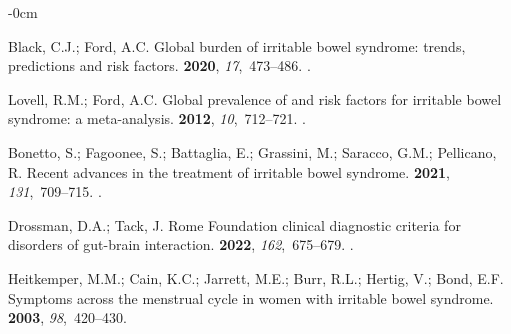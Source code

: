 \documentclass[diagnostics,article,accept,pdftex,moreauthors]{Definitions/mdpi}
\begin{document}
\begin{adjustwidth}{-\extralength}{0cm}



%
%

\begin{thebibliography}{999}

Black, C.J.; Ford, A.C.
\newblock Global burden of irritable bowel syndrome: trends, predictions and
  risk factors.
 {\bf 2020}, {\em
  17},~473--486.
.

Lovell, R.M.; Ford, A.C.
\newblock Global prevalence of and risk factors for irritable bowel syndrome: a
  meta-analysis.
 {\bf 2012}, {\em
  10},~712--721.
.

Bonetto, S.; Fagoonee, S.; Battaglia, E.; Grassini, M.; Saracco, G.M.;
  Pellicano, R.
\newblock Recent advances in the treatment of irritable bowel syndrome.
 {\bf 2021}, {\em
  131},~709--715.
.

Drossman, D.A.; Tack, J.
\newblock Rome Foundation clinical diagnostic criteria for disorders of
  gut-brain interaction.
 {\bf 2022}, {\em 162},~675--679.
.

Heitkemper, M.M.; Cain, K.C.; Jarrett, M.E.; Burr, R.L.; Hertig, V.; Bond, E.F.
\newblock Symptoms across the menstrual cycle in women with irritable bowel
  syndrome.
 {\bf 2003}, {\em 98},~420--430.


\end{thebibliography}
\end{adjustwidth}
\end{document}
